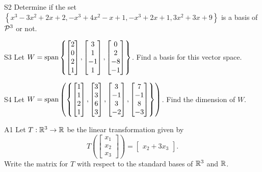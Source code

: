 \documentclass{sbgLAexam}
\begin{document}
\begin{problem}{S2}
Determine if the set $\left\{ x^3-3x^2+2x+2, -x^3+4x^2-x+1, -x^3+2x+1, 3x^2+3x+9 \right\}$ is a basis of $\P^3$ or not.
\end{problem}
\newpage

\begin{problem}{S3}
Let \(
  W={\rm span}\left\{
    \begin{bmatrix} 2 \\ 0 \\ 2 \\ 1 \end{bmatrix},
    \begin{bmatrix} 3 \\ 1 \\ -1 \\ 1 \end{bmatrix},
    \begin{bmatrix} 0 \\ 2 \\ -8 \\ -1 \end{bmatrix}
  \right\}
\). Find a basis for this vector space.
\end{problem}

\begin{problem}{S4}
Let $W = {\rm span} \left( \left\{ \begin{bmatrix} 1 \\ 1 \\ 2 \\ 1 \end{bmatrix}, \begin{bmatrix} 3 \\ 3 \\ 6 \\ 3 \end{bmatrix}, \begin{bmatrix} 3 \\ -1 \\ 3 \\ -2 \end{bmatrix}, \begin{bmatrix} 7 \\ -1 \\ 8 \\ -3 \end{bmatrix} \right\} \right)$.  Find the dimension of $W$.
\end{problem}
\newpage

\begin{problem}{A1}
Let $T: \IR^3 \rightarrow \IR$ be the linear transformation given by $$T\left(\begin{bmatrix} x_1 \\ x_2 \\ x_3  \end{bmatrix} \right) = \begin{bmatrix} x_2+3x_3 \end{bmatrix}.$$ Write the matrix for $T$ with respect to the standard bases of $\IR^3$ and $\IR$.
\end{problem}
\end{document}

